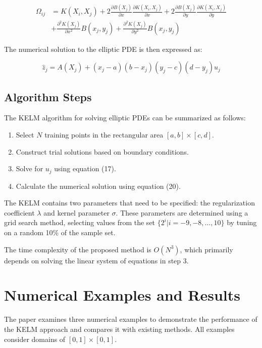\documentclass[11pt,a4paper]{article}
\begin{document}
\begin{align}
\Omega_{ij} &= K(X_i, X_j) + 2\frac{\partial B(X_j)}{\partial x}\frac{\partial K(X_i, X_j)}{\partial x} + 2\frac{\partial B(X_j)}{\partial y}\frac{\partial K(X_i, X_j)}{\partial y} \nonumber \\
&+ \frac{\partial^2 K(X_j)}{\partial x^2}B(x_j, y_j) + \frac{\partial^2 K(X_j)}{\partial y^2}B(x_j, y_j)
\end{align}

The numerical solution to the elliptic PDE is then expressed as:

\begin{equation}
\hat{z}_j = A(X_j) + (x_j - a)(b - x_j)(y_j - c)(d - y_j)u_j
\end{equation}

\subsection{Algorithm Steps}
The KELM algorithm for solving elliptic PDEs can be summarized as follows:

\begin{enumerate}
    \item Select $N$ training points in the rectangular area $[a,b] \times [c,d]$.
    \item Construct trial solutions based on boundary conditions.
    \item Solve for $u_j$ using equation (17).
    \item Calculate the numerical solution using equation (20).
\end{enumerate}

The KELM contains two parameters that need to be specified: the regularization coefficient $\lambda$ and kernel parameter $\sigma$. These parameters are determined using a grid search method, selecting values from the set $\{2^i | i = -9, -8, \ldots, 10\}$ by tuning on a random 10\% of the sample set.

The time complexity of the proposed method is $O(N^3)$, which primarily depends on solving the linear system of equations in step 3.

\section{Numerical Examples and Results}

The paper examines three numerical examples to demonstrate the performance of the KELM approach and compares it with existing methods. All examples consider domains of $[0,1] \times [0,1]$.
\end{document}
